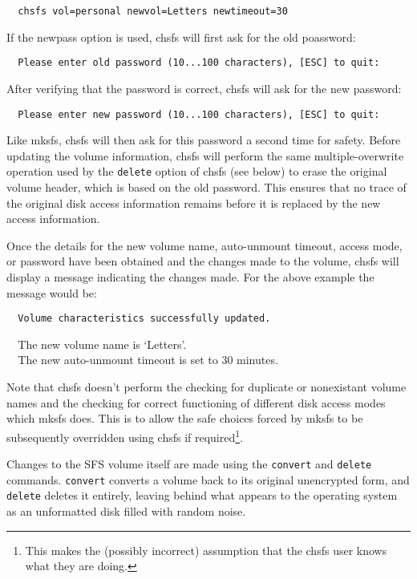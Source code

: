 {\tt \verb|  |chsfs vol=personal newvol=Letters newtimeout=30}

If the newpass option is used, chsfs will first ask for the old poassword:

{\tt \verb|  |Please enter old password (10...100 characters), [ESC] to quit:}

After verifying that the password is correct, chsfs will ask for the new
password:

{\tt \verb|  |Please enter new password (10...100 characters), [ESC] to quit:}

Like mksfs, chsfs will then ask for this password a second time for safety.
Before updating the volume information, chsfs will perform the same
multiple-overwrite operation used by the {\tt delete} option of chsfs (see below)
to erase the original volume header, which is based on the old password.  This
ensures that no trace of the original disk access information remains before it
is replaced by the new access information.

Once the details for the new volume name, auto-unmount timeout, access mode, or 
password have been obtained and the changes made to the volume, chsfs will 
display a message indicating the changes made.  For the above example the 
message would be:

{\tt \verb|  |Volume characteristics successfully updated.

     \verb|  |The new volume name is `Letters'.\\
     \verb|  |The new auto-unmount timeout is set to 30 minutes.}

Note that chsfs doesn't perform the checking for duplicate or nonexistant
volume names and the checking for correct functioning of different disk access 
modes which mksfs does.  This is to allow the safe choices forced by mksfs to 
be subsequently overridden using chsfs if required\footnote{
              This makes the (possibly incorrect) assumption that the chsfs
              user knows what they are doing.
}.

Changes to the SFS volume itself are made using the {\tt convert} and {\tt delete}
commands.  {\tt convert} converts a volume back to its original unencrypted form,
and {\tt delete} deletes it entirely, leaving behind what appears to the operating
system as an unformatted disk filled with random noise.

